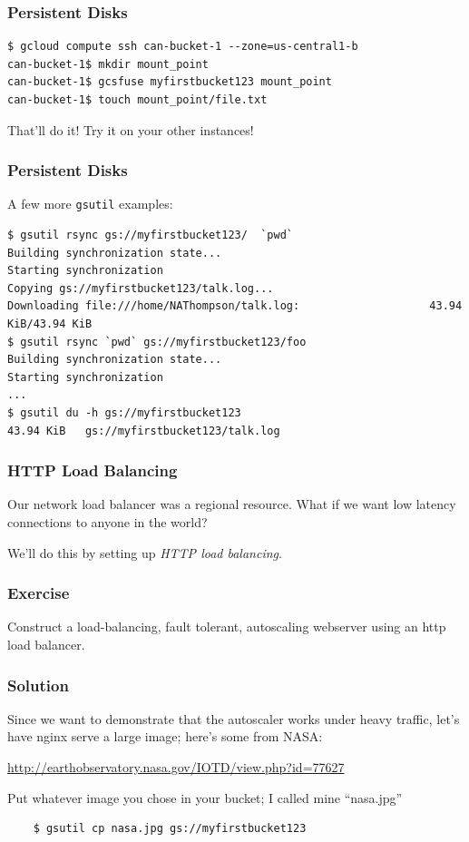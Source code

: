\documentclass[9pt]{beamer}
\begin{document}
\begin{frame}[fragile]
\frametitle{Persistent Disks}
\begin{verbatim} 
$ gcloud compute ssh can-bucket-1 --zone=us-central1-b
can-bucket-1$ mkdir mount_point
can-bucket-1$ gcsfuse myfirstbucket123 mount_point
can-bucket-1$ touch mount_point/file.txt
\end{verbatim}
That'll do it! Try it on your other instances!
\end{frame}

\begin{frame}[fragile]
  \frametitle{Persistent Disks}
  A few more \texttt{gsutil} examples:
  \begin{verbatim}
$ gsutil rsync gs://myfirstbucket123/  `pwd`
Building synchronization state...
Starting synchronization
Copying gs://myfirstbucket123/talk.log...
Downloading file:///home/NAThompson/talk.log:                    43.94 KiB/43.94 KiB
$ gsutil rsync `pwd` gs://myfirstbucket123/foo
Building synchronization state...
Starting synchronization
...
$ gsutil du -h gs://myfirstbucket123
43.94 KiB   gs://myfirstbucket123/talk.log
  \end{verbatim}
\end{frame}

\begin{frame}[fragile]
  \frametitle{HTTP Load Balancing}
  Our network load balancer was a regional resource. What if we want low latency connections to anyone in the world?

  We'll do this by setting up \emph{HTTP load balancing}.
\end{frame}

\begin{frame}[fragile]
  \frametitle{Exercise}
  Construct a load-balancing, fault tolerant, autoscaling webserver using an http load balancer.
\end{frame}

\begin{frame}[fragile]
  \frametitle{Solution}
  Since we want to demonstrate that the autoscaler works under heavy traffic, let's have nginx serve a large image; here's some from NASA:

  \href{http://earthobservatory.nasa.gov/IOTD/view.php?id=77627}{http://earthobservatory.nasa.gov/IOTD/view.php?id=77627}

  Put whatever image you chose in your bucket; I called mine ``nasa.jpg''
  \begin{verbatim}
    $ gsutil cp nasa.jpg gs://myfirstbucket123
  \end{verbatim}
\end{frame}
\end{document}
